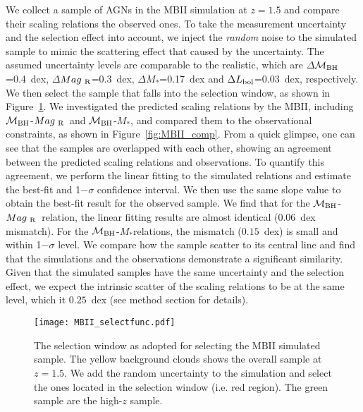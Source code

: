 \documentclass{natureprintstyle}
\newcommand{\mbh}{$\mathcal M_{\rm BH}$}
\newcommand{\mr}{$Mag_{\rm ~R}$}
\newcommand{\mstar}{{$M_*$}}
\begin{document}
We collect a sample of AGNs in the MBII simulation at $z=1.5$ and compare their scaling relations the observed ones. To take the measurement uncertainty and the selection effect into account, we inject the {\it random} noise to the simulated sample to mimic the scattering effect that caused by the uncertainty. The assumed uncertainty levels are comparable to the realistic, which are $\Delta$\mbh =0.4~dex, $\Delta$\mr=0.3~dex, $\Delta$\mstar=0.17~dex and $\Delta L_{\rm bol}$=0.03~dex, respectively. We then select the sample that falls into the selection window, as shown in Figure~\ref{fig:selectfunc}. We investigated the predicted scaling relations by the MBII, including \mbh-\mr\ and \mbh-\mstar, and compared them to the observational constraints, as shown in Figure~\ref{fig:MBII_comp}. From a quick glimpse, one can see that the samples are overlapped with each other, showing an agreement between the predicted scaling relations and observations. To quantify this agreement, we perform the linear fitting to the simulated relations and estimate the best-fit and 1$-\sigma$ confidence interval. We then use the same slope value to obtain the best-fit result for the observed sample. We find that for the \mbh-\mr\ relation, the linear fitting results are almost identical ($0.06$~dex mismatch). For the \mbh-\mstar relations, the mismatch ($0.15$~dex) is small and within 1$-\sigma$ level. We compare how the sample scatter to its central line and find that the simulations and the observations demonstrate a significant similarity. Given that the simulated samples have the same uncertainty and the selection effect, we expect the intrinsic scatter of the scaling relations to be at the same level, which it $0.25$~dex (see method section for details).

\begin{figure}[t]
\texttt{[image: MBII\_selectfunc.pdf]}
\caption{The selection window as adopted for selecting the MBII simulated sample. The yellow background clouds shows the overall sample at $z=1.5$. We add the random uncertainty to the simulation and select the ones located in the selection window (i.e. red region). The green sample are the high-$z$ sample.}
\label{fig:selectfunc}
\end{figure}
\end{document}

